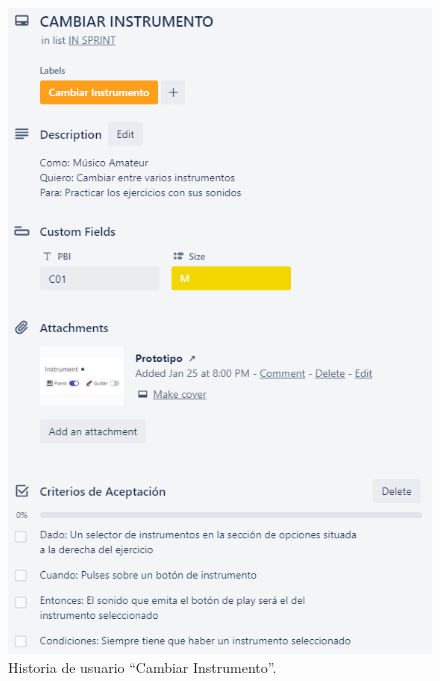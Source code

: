 \documentclass[12pt,twoside,titlepage]{report}
\begin{document}
{\begin{figure}[H]
    \centering
    \includegraphics[scale=1.3]{Scrum/User Stories/Instrumentos}
    \caption{Historia de usuario ``Cambiar Instrumento''.}
    \label{fig:Instrumentos}
\end{figure}

}
\end{document}

